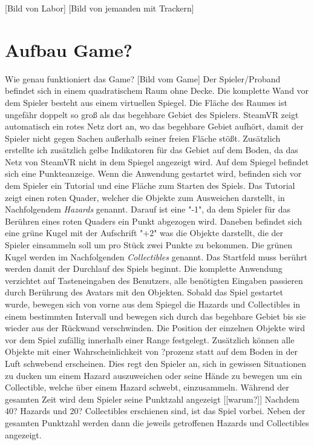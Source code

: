 [Bild von Labor] [Bild von jemanden mit Trackern]

\section{Aufbau Game?}
Wie genau funktioniert das Game?
[Bild vom Game]
Der Spieler/Proband befindet sich in einem quadratischem Raum ohne Decke. Die komplette Wand vor dem Spieler besteht aus einem virtuellen Spiegel. Die Fläche des Raumes ist ungefähr doppelt so groß als das begehbare Gebiet des Spielers. SteamVR zeigt automatisch ein rotes Netz dort an, wo das begehbare Gebiet aufhört, damit der Spieler nicht gegen Sachen außerhalb seiner freien Fläche stößt. Zusätzlich erstellte ich zusätzlich gelbe Indikatoren für das Gebiet auf dem Boden, da das Netz von SteamVR nicht in dem Spiegel angezeigt wird. Auf dem Spiegel befindet sich eine Punkteanzeige.
Wenn die Anwendung gestartet wird, befinden sich vor dem Spieler ein Tutorial und eine Fläche zum Starten des Spiels. Das Tutorial zeigt einen roten Quader, welcher die Objekte zum Ausweichen darstellt, in Nachfolgendem \textit{Hazards} genannt. Darauf ist eine "-1", da dem Spieler für das Berühren eines roten Quaders ein Punkt abgezogen wird. Daneben befindet sich eine grüne Kugel mit der Aufschrift "+2" was die Objekte darstellt, die der Spieler einsammeln soll um pro Stück zwei Punkte zu bekommen. Die grünen Kugel werden im Nachfolgenden \textit{Collectibles} genannt.
Das Startfeld muss berührt werden damit der Durchlauf des Spiels beginnt. Die komplette Anwendung verzichtet auf Tasteneingaben des Benutzers, alle benötigten Eingaben passieren durch Berührung des Avatars mit den Objekten.
Sobald das Spiel gestartet wurde, bewegen sich von vorne aus dem Spiegel die Hazards und Collectibles in einem bestimmten Intervall und bewegen sich durch das begehbare Gebiet bis sie wieder aus der Rückwand verschwinden. Die Position der einzelnen Objekte wird vor dem Spiel zufällig innerhalb einer Range festgelegt. Zusätzlich können alle Objekte mit einer Wahrscheinlichkeit von ?prozenz statt auf dem Boden in der Luft schwebend erscheinen. Dies regt den Spieler an, sich in gewissen Situationen zu ducken um einem Hazard auszuweichen oder seine Hände zu bewegen um ein Collectible, welche über einem Hazard schwebt, einzusammeln. Während der gesamten Zeit wird dem Spieler seine Punktzahl angezeigt [[warum?]] Nachdem 40? Hazards und 20? Collectibles erschienen sind, ist das Spiel vorbei. Neben der gesamten Punktzahl werden dann die jeweils getroffenen Hazards und Collectibles angezeigt. 



